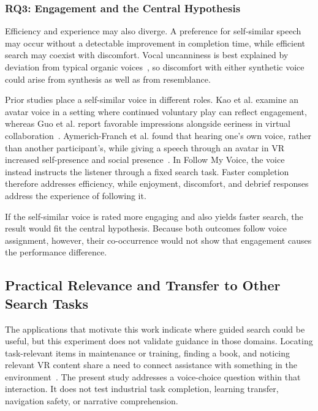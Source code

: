 \subsubsection{RQ3: Engagement and the Central Hypothesis}
Efficiency and experience may also diverge. A preference for self-similar speech may occur without a detectable improvement in completion time, while efficient search may coexist with discomfort. Vocal uncanniness is best explained by deviation from typical organic voices~\cite{diel2024uncanny}, so discomfort with either synthetic voice could arise from synthesis as well as from resemblance.

Prior studies place a self-similar voice in different roles. Kao et al. examine an avatar voice in a setting where continued voluntary play can reflect engagement, whereas Guo et al. report favorable impressions alongside eeriness in virtual collaboration~\cite{kao2021selfsimilar,guo2024doppelganger}. Aymerich-Franch et al. found that hearing one's own voice, rather than another participant's, while giving a speech through an avatar in VR increased self-presence and social presence~\cite{aymerich2012voicesimilarity}. In Follow My Voice, the voice instead instructs the listener through a fixed search task. Faster completion therefore addresses efficiency, while enjoyment, discomfort, and debrief responses address the experience of following it.

If the self-similar voice is rated more engaging and also yields faster search, the result would fit the central hypothesis. Because both outcomes follow voice assignment, however, their co-occurrence would not show that engagement causes the performance difference.

\subsection{Practical Relevance and Transfer to Other Search Tasks}
The applications that motivate this work indicate where guided search could be useful, but this experiment does not validate guidance in those domains. Locating task-relevant items in maintenance or training, finding a book, and noticing relevant VR content share a need to connect assistance with something in the environment~\cite{binetti2021outofview,zhang2023seehear,lange2020hivefive}. The present study addresses a voice-choice question within that interaction. It does not test industrial task completion, learning transfer, navigation safety, or narrative comprehension.

